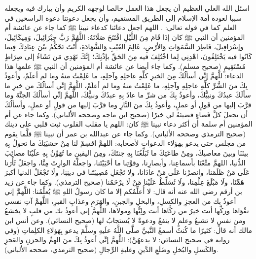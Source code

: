 اسئل الله العلي العظيم أن يجعل هذا العمل خالصا لوجهه الكريم وأن يبارك فيه ويجعله سببا لعودة أمة الإسلام إلى الطريق المستقيم، وأن يجعل دعوتنا دعوة الراسخين في العلم كما في قوله تعالى:
\quranayah*[3][7][32]\quranayah*[3][8]{\footnotesize \surahname*[3]}. اللهم اجعل دعائنا كدعاء نبينا ﷺ كما جاء عن عائشة أم المؤمنين أن النبي ﷺ كان إذَا قَامَ مِنَ اللَّيْلِ افْتَتَحَ صَلَاتَهُ: اللَّهُمَّ رَبَّ جِبْرَائِيلَ، وَمِيكَائِيلَ، وإسْرَافِيلَ، فَاطِرَ السَّمَوَاتِ وَالأرْضِ، عَالِمَ الغَيْبِ وَالشَّهَادَةِ، أَنْتَ تَحْكُمُ بيْنَ عِبَادِكَ فِيما كَانُوا فيه يَخْتَلِفُونَ، اهْدِنِي لِما اخْتُلِفَ فيه مِنَ الحَقِّ بإذْنِكَ؛ إنَّكَ تَهْدِي مَن تَشَاءُ إلى صِرَاطٍ مُسْتَقِيمٍ {\footnotesize (صحيح مسلم)}. وكما جاء أيضا عن عائشة أم المؤمنين أن النبي ﷺ علمها هذا الدعاء: 
للَّهمَّ إنِّي أسألُكَ مِنَ الخيرِ كلِّهِ عاجلِهِ وآجلِهِ، ما عَلِمْتُ منهُ وما لم أعلَمْ، وأعوذُ بِكَ منَ الشَّرِّ كلِّهِ عاجلِهِ وآجلِهِ، ما عَلِمْتُ منهُ وما لم أعلَمْ، اللَّهمَّ إنِّي أسألُكَ من خيرِ ما سألَكَ عبدُكَ ونبيُّكَ، وأعوذُ بِكَ من شرِّ ما عاذَ بِهِ عبدُكَ ونبيُّكَ، اللَّهمَّ إنِّي أسألُكَ الجنَّةَ وما قرَّبَ إليها من قَولٍ أو عملٍ، وأعوذُ بِكَ منَ النَّارِ وما قرَّبَ إليها من قولٍ أو عملٍ، وأسألُكَ أن تجعلَ كلَّ قَضاءٍ قضيتَهُ لي خيرًا {\footnotesize (صحيح ابن ماجه وصححه الألباني)}. وكما جاء عن أم المؤمنين أم سلمة أن أكثر دعاء نبينا ﷺ كان: اللهم يا مقلب القلوب ثبت قلبي على دينك {\footnotesize (صحيح الترمذي وصححه الألباني)}.  وكما جاء عن عبدالله بن عمر أن نبينا ﷺ قلَّما يقوم من مجلس حتى يدعو بهؤلاء الدعوات لأصحابه: اللهمَّ اقسِمْ لنا مِنْ خشيَتِكَ ما تحولُ بِهِ بينَنَا وبينَ معاصيكَ، ومِنْ طاعَتِكَ ما تُبَلِّغُنَا بِهِ جنتَكَ، ومِنَ اليقينِ ما تُهَوِّنُ بِهِ علَيْنَا مصائِبَ الدُّنيا، اللهمَّ متِّعْنَا بأسماعِنا، وأبصارِنا، وقوَّتِنا ما أحْيَيْتَنا، واجعلْهُ الوارِثَ مِنَّا، واجعَلْ ثَأْرَنا عَلَى مَنْ ظلَمَنا، وانصرْنا عَلَى مَنْ عادَانا، ولا تَجْعَلِ مُصِيبَتَنا في دينِنِا، ولَا تَجْعَلْ الدنيا أكبرَ هَمِّنَا، ولَا مَبْلَغَ عِلْمِنا، ولَا تُسَلِّطْ عَلَيْنا مَنْ لَا يرْحَمُنا {\footnotesize (صحيح الترمذي)}. وكما جاء عن زيد بن أرقم رضي الله عنه أنه قال: لا أُعلِّمُكم إلا ما كان رسولُ اللهِ ﷺ يُعلِّمُنا: اللَّهمَّ إني أعوذُ بك من العجزِ والكسلِ، والبخلِ والجبنِ، والهَرَمِ وعذابِ القبرِ، اللَّهمَّ آتِ نفسي تقْوَاها وزكِّها أنت خيرُ من زكَّاها أنت ولِيُّها ومولاها، اللَّهمَّ إني أعوذُ بك من قلبٍ لا يخشعُ ومن نفسٍ لا تشبعُ وعلمٍ لا ينفعُ ودعوةٌ لا يُستجابُ لها {\footnotesize (صحيح النسائي)}. وعن أنس ابن مالك أنه قال: كثيرًا ما كُنتُ أسمعُ النَّبيَّ صلَّى اللَّهُ علَيهِ وسلَّمَ يدعو بِهَؤلاءِ الكلِماتِ (وفي رواية في صحيح النسائي: لا يدعهُنَّ): اللَّهمَّ إنِّي أعوذُ بِكَ منَ الهمِّ والحزنِ والعَجزِ والكَسلِ والبُخلِ وضَلَعِ الدَّينِ وغلبةِ الرِّجالِ {\footnotesize (صحيح الترمذي، صححه الألباني)}.
